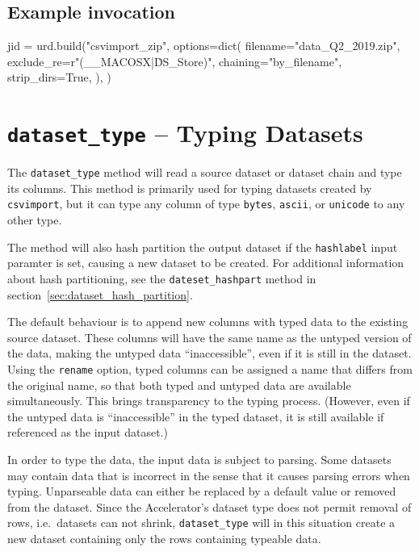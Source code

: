 \subsection{Example invocation}

\begin{python}
    jid = urd.build("csvimport_zip",
        options=dict(
            filename="data_Q2_2019.zip",
            exclude_re=r"(__MACOSX|\.DS_Store)",
            chaining="by_filename",
            strip_dirs=True,
        ),
    )
\end{python}



\clearpage
\section{\texttt{dataset\_type} -- Typing Datasets}
The \texttt{dataset\_type} method will read a source dataset or
dataset chain and type its columns.  This method is primarily used for
typing datasets created by \texttt{csvimport}, but it can type any
column of type \texttt{bytes}, \texttt{ascii}, or \texttt{unicode} to
any other type.

The method will also hash partition the output dataset if the
\texttt{hashlabel} input paramter is set, causing a new dataset to be
created.  For additional information about hash partitioning, see the
\texttt{dateset\_hashpart} method in section~\ref{sec:dataset_hash_partition}.

The default behaviour is to append new columns with typed data to the
existing source dataset.  These columns will have the same name as the
untyped version of the data, making the untyped data ``inaccessible'',
even if it is still in the dataset.  Using the \texttt{rename} option,
typed columns can be assigned a name that differs from the original
name, so that both typed and untyped data are available
simultaneously.  This brings transparency to the typing process.
(However, even if the untyped data is ``inaccessible'' in the typed
dataset, it is still available if referenced as the input dataset.)

In order to type the data, the input data is subject to parsing.  Some
datasets may contain data that is incorrect in the sense that it
causes parsing errors when typing.  Unparseable data can either be
replaced by a default value or removed from the dataset.  Since the
Accelerator's dataset type does not permit removal of rows,
i.e.\ datasets can not shrink, \texttt{dataset\_type} will in this
situation create a new dataset containing only the rows containing
typeable data.

